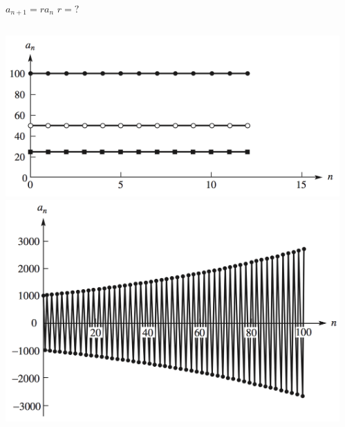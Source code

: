 \documentclass[
  ignorenonframetext,
]{ctexbeamer}
\begin{document}
\begin{frame}{\(a_{n+1}=ra_n\)}
\label{a_n1ra_n}
\(r = ?\)

\begin{columns}[T]
\begin{column}{0.4\textwidth}
\includegraphics{r0.png} \includegraphics{rn.png}
\end{column}

\begin{column}{0.2\textwidth}
\end{column}


\end{columns}
\end{frame}
\end{document}
